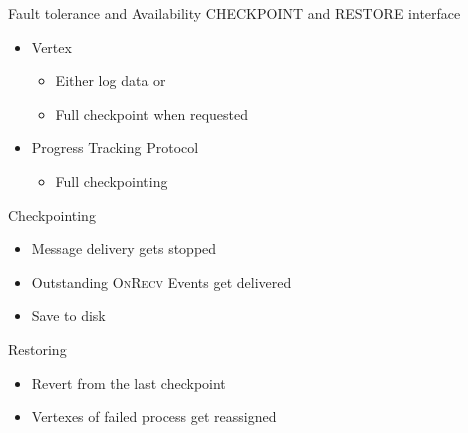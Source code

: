  \begin{frame}[t]{Fault tolerance and Availability}
  \vspace{0.15cm}
  \textsc{CHECKPOINT} and \textsc{RESTORE} interface
   \begin{itemize}\setlength\itemsep{0.25cm}
     \item Vertex
	 \begin{itemize}\setlength\itemsep{0.25cm}
	 	\item Either log data or
        \item Full checkpoint when requested
	 \end{itemize}
     \item Progress Tracking Protocol
     \begin{itemize}\setlength\itemsep{0.25cm}
     	\item Full checkpointing
     \end{itemize}
   \end{itemize}
   
   \pause
   \vspace{0.15cm}
   Checkpointing
   \begin{itemize}
     \item Message delivery gets stopped
     \item Outstanding \textsc{OnRecv} Events get delivered
     \item Save to disk
   \end{itemize}

   \vspace{0.15cm} 
   Restoring
   \begin{itemize}
   \item Revert from the last checkpoint
   \item Vertexes of failed process get reassigned
   \end{itemize}

\end{frame}



